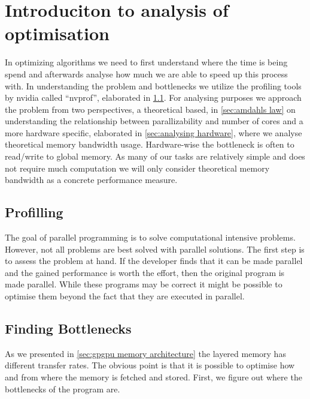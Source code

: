 \section{Introduciton to analysis of optimisation}
\label{sec:introduction to analysis of optimisation}
In optimizing algorithms we need to first understand where the time is being spend and afterwards analyse how much we are able to speed up this process with.
In understanding the problem and bottlenecks we utilize the profiling tools by nvidia called ``nvprof'', elaborated in \cref{sec:profiling}.
For analysing purposes we approach the problem from two perspectives, a theoretical based, in \cref{sec:amdahls law} on understanding the relationship between parallizability and number of cores and a more hardware specific, elaborated in \cref{sec:analysing hardware}, where we analyse theoretical memory bandwidth usage.
Hardware-wise the bottleneck is often to read/write to global memory.
As many of our tasks are relatively simple and does not require much computation we will only consider theoretical memory bandwidth as a concrete performance measure.

\subsection{Profilling}
\label{sec:profiling}

The goal of parallel programming is to solve computational intensive problems.
However, not all problems are best solved with parallel solutions.
The first step is to assess the problem at hand.
If the developer finds that it can be made parallel and the gained performance is worth the effort, then the original program is made parallel.
While these programs may be correct it might be possible to optimise them beyond the fact that they are executed in parallel.~\cite{nvidia2015doc}

\subsection{Finding Bottlenecks}
\label{sec:finding bottlenecks}

As we presented in \cref{sec:gpgpu memory architecture} the layered memory has different transfer rates.
The obvious point is that it is possible to optimise how and from where the memory is fetched and stored.
First, we figure out where the bottlenecks of the program are.~\cite{farber2011cuda}

